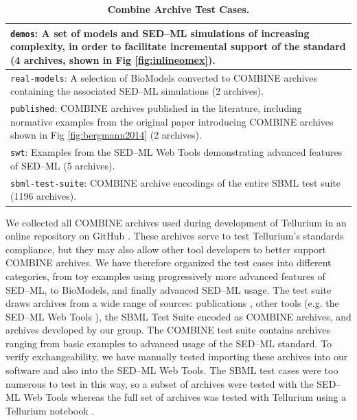 \documentclass[10pt,letterpaper]{article}
\newlength\savedwidth
\newcommand\thickhline{\noalign{\global\savedwidth\arrayrulewidth\global\arrayrulewidth 2pt}%
\hline
\noalign{\global\arrayrulewidth\savedwidth}}
\begin{document}
\begin{table}[t]
\centering
\caption{
{\bf Combine Archive Test Cases.} }
\begin{tabular}{p{12cm}}
\hline %
  \texttt{demos}: A set of models and SED--ML simulations of increasing complexity, in order to facilitate incremental support of the standard (4 archives, shown in Fig \ref{fig:inlineomex}). \\ \hline
  \texttt{real-models}: A selection of BioModels converted to COMBINE archives containing the associated SED--ML simulations (2 archives). \\ \hline
  \texttt{published}: COMBINE archives published in the literature, including normative examples from the original paper introducing COMBINE archives \cite{bergmann2014combine} shown in Fig \ref{fig:bergmann2014} (2 archives). \\ \hline
  \texttt{swt}: Examples from the SED--ML Web Tools \cite{bergmann2017sed} demonstrating advanced features of SED--ML (5 archives). \\ \hline
  \texttt{sbml-test-suite}: COMBINE archive encodings of the entire SBML test suite (1196 archives). \\ \hline
\end{tabular}
\begin{flushleft} We collected all COMBINE archives used during development of Tellurium in an online repository on GitHub \cite{catests}. These archives serve to test Tellurium's standards compliance, but they may also allow other tool developers to better support COMBINE archives. We have therefore organized the test cases into different categories, from toy examples using progressively more advanced features of SED--ML, to BioModels, and finally advanced SED--ML usage. The test suite draws archives from a wide range of sources: publications \cite{bergmann2014combine,scharmf1000}, other tools (e.g. the SED--ML Web Tools \cite{bergmann2017sed}), the SBML Test Suite encoded as COMBINE archives, and archives developed by our group. The COMBINE test suite contains archives ranging from basic examples to advanced usage of the SED--ML standard. To verify exchangeability, we have manually tested importing these archives into our software and also into the SED--ML Web Tools. The SBML test cases were too numerous to test in this way, so a subset of archives were tested with the SED--ML Web Tools whereas the full set of archives was tested with Tellurium using a Tellurium notebook \cite{sbmltsnotebook}.
\end{flushleft}
\label{combine-archive-tests}
\end{table}
\end{document}
